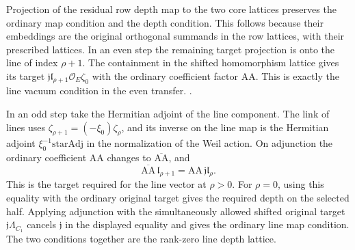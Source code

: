 Projection of the residual row depth map to the two
core lattices preserves the ordinary map condition and
the depth condition. This follows because their
embeddings are the original orthogonal summands in the
row lattices, with their prescribed lattices. In an even
step the remaining target projection is onto the line
of index \(\rho+1\). The containment in the shifted
homomorphism lattice gives its target
\(\mathfrak j\mathfrak l_{\rho+1}\mathcal O_E\zeta_0\)
with the ordinary coefficient factor \(\mathrm{AA}\).
This is exactly the line vacuum condition in the
even transfer.
.

In an odd step take the Hermitian adjoint of the
line component. The link of lines uses
\(\zeta_{\rho+1}=(-\xi_0)\zeta_\rho\), and its
inverse on the line map is the Hermitian adjoint
\(\xi_0^{-1}\mathrm{starAdj}\) in the normalization
of the Weil action. On adjunction the ordinary
coefficient \(\mathrm{AA}\) changes to
\(\overline{\mathrm{AA}}\), and
\[
 \overline{\mathrm{AA}}\,\mathfrak l_{\rho+1}
    =\mathrm{AA}\,\mathfrak j\mathfrak l_\rho .
\]
This is the target required for the line vector at
\(\rho>0\). For \(\rho=0\), using this equality with the
ordinary original target gives the required depth on
the selected half. Applying adjunction with the
simultaneously allowed shifted original target
\(\mathfrak j\Lambda_{C_1}\) cancels \(\mathfrak j\)
in the displayed equality and gives the ordinary line
map condition. The two conditions together are the
rank-zero line depth lattice.

